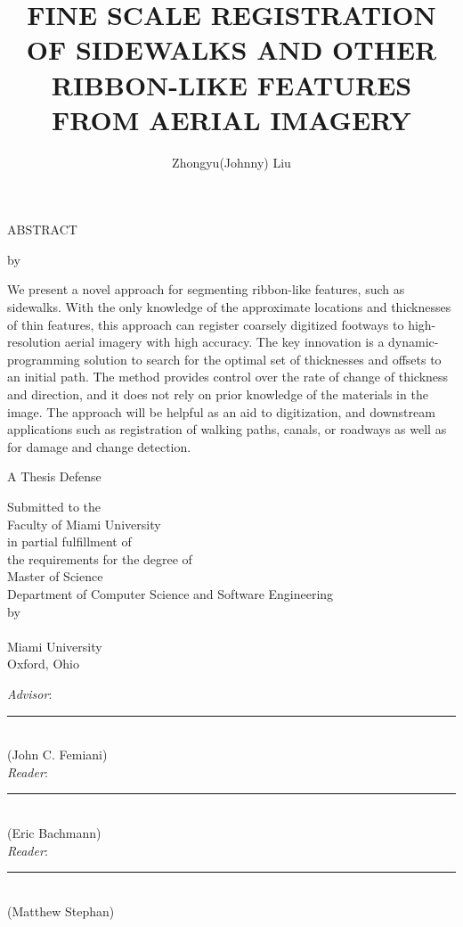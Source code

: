 \documentclass[12pt, oneside]{book2}
\title{FINE SCALE REGISTRATION OF SIDEWALKS AND OTHER RIBBON-LIKE FEATURES FROM AERIAL IMAGERY}
\author{Zhongyu(Johnny) Liu}
\def\Advisor{John C. Femiani}
\def\ReaderOne{Eric Bachmann}
\def\ReaderTwo{Matthew Stephan}
\def\Abstract{

    We present a novel approach for segmenting ribbon-like features, such as sidewalks. With the only knowledge of the approximate locations and thicknesses of thin features, this approach can register coarsely digitized footways to high-resolution aerial imagery with high accuracy. The key innovation is a dynamic-programming solution to search for the optimal set of thicknesses and offsets to an initial path. The method provides control over the rate of change of thickness and direction, and it does not rely on prior knowledge of the materials in the image. The approach will be helpful as an aid to digitization, and downstream applications such as registration of walking paths, canals, or roadways as well as for damage and change detection. 

}
\begin{document}
\thispagestyle{empty}
\singlespacing

\begin{center}
ABSTRACT

\vspace{2.0cm}

\makeatletter
\MakeUppercase{\@title}
\makeatother

\vspace{1.0cm}

by \makeatletter\@author\makeatother


\vspace{1.0cm}
\end{center}

\noindent \Abstract{}

\newpage

\thispagestyle{empty}

\frontmatter

\onehalfspacing

\begin{titlepage}
\begin{center}
\makeatletter
\MakeUppercase{\@title}
\makeatother

\vspace{1.5cm}

A Thesis Defense\\

\vspace{0.5cm}

Submitted to the \\
Faculty of Miami University \\
in partial fulfillment of \\
the requirements for the degree of \\
Master of Science \\
Department of Computer Science and Software Engineering \\
by \\
\makeatletter\@author\makeatother \\
Miami University \\
Oxford, Ohio \\
\the\year

\vspace{1.5cm}

\emph{Advisor}: \rule[-0.1cm]{8cm}{0.01cm} \\
(\Advisor) \\
\vspace{1.5cm}
\emph{Reader}: \rule[-0.1cm]{8cm}{0.01cm} \\
(\ReaderOne) \\
\vspace{1.5cm}
\emph{Reader}: \rule[-0.1cm]{8cm}{0.01cm} \\
(\ReaderTwo) \\
\end{center}
\end{titlepage}
\end{document}
